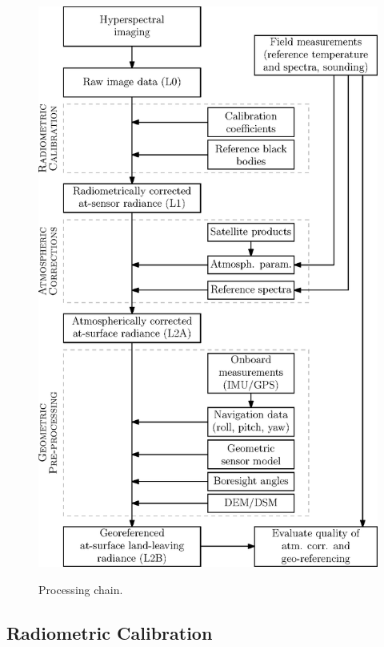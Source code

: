 \begin{figure}[thb]
	\centering
	\vspace{0.7 em}
	\includegraphics[scale=1]{pics/Chapter_02/Fig_2_3.eps}
	\label{fig:ProcessingChain}
	\vspace{2 em}
	\caption{Processing chain.}
	\label{fig:ProcessingChain}
	\vspace{0.7 em}
\end{figure}


\subsection{Radiometric Calibration}

